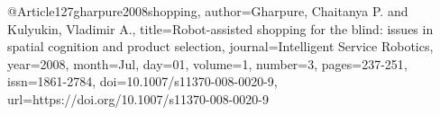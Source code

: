@Article{127gharpure2008shopping,
author={Gharpure, Chaitanya P.
and Kulyukin, Vladimir A.},
title={Robot-assisted shopping for the blind: issues in spatial cognition and product selection},
journal={Intelligent Service Robotics},
year={2008},
month={Jul},
day={01},
volume={1},
number={3},
pages={237-251},
issn={1861-2784},
doi={10.1007/s11370-008-0020-9},
url={https://doi.org/10.1007/s11370-008-0020-9}
}